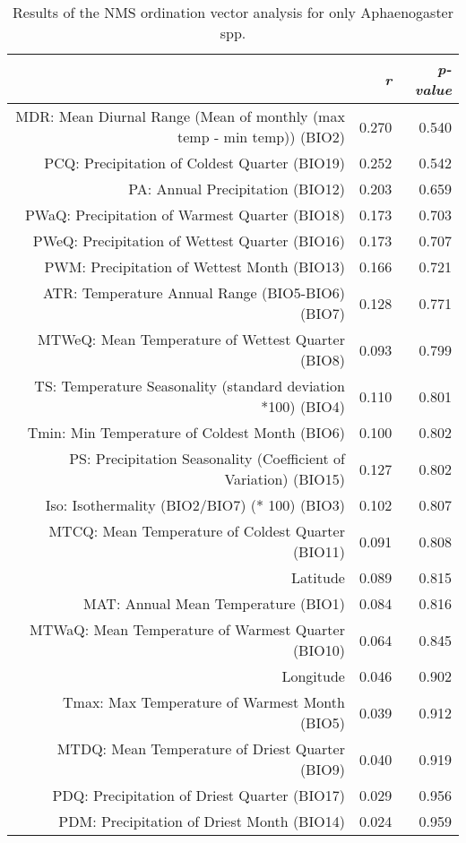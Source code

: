 \begin{table}[ht]
\centering
\begin{tabular}{rrr}
  \hline
 & {\emph{r}} & {\emph{p-value}} \\ 
  \hline
MDR: Mean Diurnal Range (Mean of monthly (max temp - min temp)) (BIO2) & 0.270 & 0.540 \\ 
  PCQ: Precipitation of Coldest Quarter (BIO19) & 0.252 & 0.542 \\ 
  PA: Annual Precipitation (BIO12) & 0.203 & 0.659 \\ 
  PWaQ: Precipitation of Warmest Quarter (BIO18) & 0.173 & 0.703 \\ 
  PWeQ: Precipitation of Wettest Quarter (BIO16) & 0.173 & 0.707 \\ 
  PWM: Precipitation of Wettest Month (BIO13) & 0.166 & 0.721 \\ 
  ATR: Temperature Annual Range (BIO5-BIO6) (BIO7) & 0.128 & 0.771 \\ 
  MTWeQ: Mean Temperature of Wettest Quarter (BIO8) & 0.093 & 0.799 \\ 
  TS: Temperature Seasonality (standard deviation *100) (BIO4) & 0.110 & 0.801 \\ 
  Tmin: Min Temperature of Coldest Month (BIO6) & 0.100 & 0.802 \\ 
  PS: Precipitation Seasonality (Coefficient of Variation) (BIO15) & 0.127 & 0.802 \\ 
  Iso: Isothermality (BIO2/BIO7) (* 100) (BIO3) & 0.102 & 0.807 \\ 
  MTCQ: Mean Temperature of Coldest Quarter (BIO11) & 0.091 & 0.808 \\ 
  Latitude & 0.089 & 0.815 \\ 
  MAT: Annual Mean Temperature (BIO1) & 0.084 & 0.816 \\ 
  MTWaQ: Mean Temperature of Warmest Quarter (BIO10) & 0.064 & 0.845 \\ 
  Longitude & 0.046 & 0.902 \\ 
  Tmax: Max Temperature of Warmest Month (BIO5) & 0.039 & 0.912 \\ 
  MTDQ: Mean Temperature of Driest Quarter (BIO9) & 0.040 & 0.919 \\ 
  PDQ: Precipitation of Driest Quarter (BIO17) & 0.029 & 0.956 \\ 
  PDM: Precipitation of Driest Month (BIO14) & 0.024 & 0.959 \\ 
   \hline
\end{tabular}
\caption{Results of the NMS ordination vector analysis for only Aphaenogaster spp.} 
\label{tab:wc_apg_vec}
\end{table}

